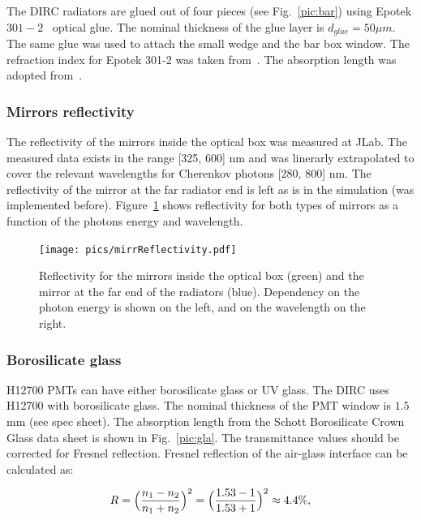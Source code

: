 The \babar DIRC radiators are glued out of four pieces (see Fig.~\ref{pic:bar}) using Epotek $301-2$~\cite{Epotek} optical glue. The nominal thickness of the glue layer is $d_{glue} = 50 \mu m$. The same glue was used to attach the small wedge and the bar box window. The refraction index for Epotek 301-2 was taken from~\cite{EpotekData}. The absorption length was adopted from~\cite{EpotekData}.

\subsubsection*{Mirrors reflectivity}

The reflectivity of the mirrors inside the optical box was measured at JLab. The measured data exists in the range [325, 600] nm and was linerarly extrapolated to cover the relevant wavelengths for Cherenkov photons [280, 800] nm.  The reflectivity of the mirror at the far radiator end is left as is in the simulation (was implemented before). Figure~\ref{pic:mirr} shows reflectivity for both types of mirrors as a function of the photons energy and wavelength.

\begin{figure}[!h]
\centering
\texttt{[image: pics/mirrReflectivity.pdf]}
\caption{\label{pic:mirr}
Reflectivity for the mirrors inside the optical box (green) and the mirror at the far end of the radiators (blue). Dependency on the photon energy is shown on the left, and on the wavelength on the right. 
}
\end{figure}

\subsubsection*{Borosilicate glass}

H12700 PMTs can have either borosilicate glass or UV glass. The \gluex DIRC uses H12700 with borosilicate glass. The nominal thickness of the PMT window is $1.5$ mm (see spec sheet). The absorption length from the Schott Borosilicate Crown Glass data sheet is shown in Fig.~\ref{pic:gla}. The transmittance values should be corrected for Fresnel reflection. Fresnel reflection of the air-glass interface can be calculated as:

\begin{equation}
R = \Bigl( \frac{n_1 - n_2}{n_1 + n_2} \Bigr)^{2} = \Bigl( \frac{1.53 - 1}{1.53 + 1} \Bigr) ^{2} \approx 4.4\%,
\label{eq:fre}
\end{equation}

